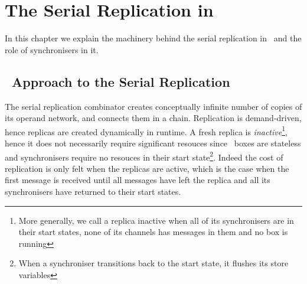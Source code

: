 \chapter{The Serial Replication in \ak\ }

In this chapter we explain the machinery behind the serial replication in \ak\ and the role of synchronisers in it.
%


    \section{\ak\ Approach to the Serial Replication}
The serial replication combinator creates conceptually infinite number of copies of its operand network, and connects them in a chain. Replication is demand-driven, hence replicas are created dynamically in runtime. A fresh replica is \emph{inactive}\footnote{More generally, we call a replica inactive when all of its synchronisers are in their start states, none of its channels has messages in them and no box is running}, hence it does not necessarily require significant resouces since \ak\ boxes are stateless and synchronisers require no resouces in their start state\footnote{When a synchroniser transitions back to the start state, it flushes its store variables}. Indeed the cost of replication is only felt when the replicas are active, which is the case when the first message is received until all messages have left the replica and all its synchronisers have returned to their start states.

